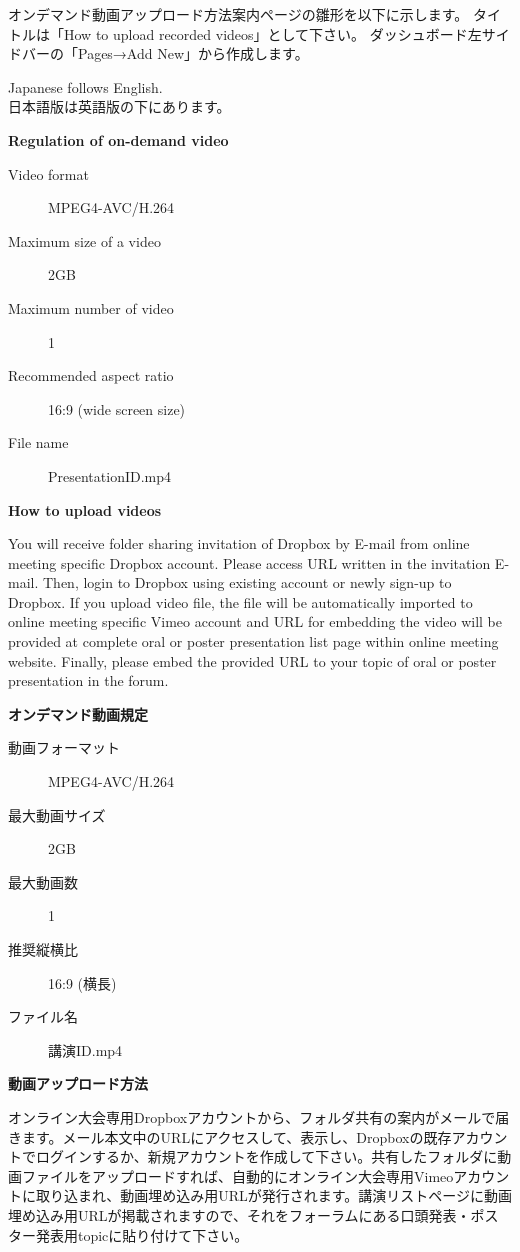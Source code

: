\documentclass[titlepage,10pt,a4paper,uplatex]{jsbook}
\newenvironment{content}{\begin{shaded}\vspace{-1em}\raggedright\ttfamily\footnotesize\setlength{\baselineskip}{1.4em}}{\end{shaded}\vspace{-1em}}
\renewcommand{\textbf}[1]{{\bfseries\sffamily#1}}
\begin{document}
オンデマンド動画アップロード方法案内ページの雛形を以下に示します。
タイトルは「How to upload recorded videos」として下さい。
ダッシュボード左サイドバーの「Pages→Add New」から作成します。

\begin{content}
Japanese follows English.\\
日本語版は英語版の下にあります。

\textbf{\Large Regulation of on-demand video}

\begin{description}
\item[Video format] MPEG4-AVC/H.264
\item[Maximum size of a video] 2GB
\item[Maximum number of video] 1
\item[Recommended aspect ratio] 16:9 (wide screen size)
\item[File name] PresentationID.mp4
\end{description}

\textbf{\Large How to upload videos}

You will receive folder sharing invitation of Dropbox by E-mail from online meeting specific Dropbox account. Please access URL written in the invitation E-mail. Then, login to Dropbox using existing account or newly sign-up to Dropbox. If you upload video file, the file will be automatically imported to online meeting specific Vimeo account and URL for embedding the video will be provided at complete oral or poster presentation list page within online meeting website. Finally, please embed the provided URL to your topic of oral or poster presentation in the forum.

\textbf{\Large オンデマンド動画規定}

\begin{description}
\item[動画フォーマット] MPEG4-AVC/H.264
\item[最大動画サイズ] 2GB
\item[最大動画数] 1
\item[推奨縦横比] 16:9 (横長)
\item[ファイル名] 講演ID.mp4
\end{description}

\textbf{\Large 動画アップロード方法}

オンライン大会専用Dropboxアカウントから、フォルダ共有の案内がメールで届きます。メール本文中のURLにアクセスして、表示し、Dropboxの既存アカウントでログインするか、新規アカウントを作成して下さい。共有したフォルダに動画ファイルをアップロードすれば、自動的にオンライン大会専用Vimeoアカウントに取り込まれ、動画埋め込み用URLが発行されます。講演リストページに動画埋め込み用URLが掲載されますので、それをフォーラムにある口頭発表・ポスター発表用topicに貼り付けて下さい。
\end{content}
\end{document}
